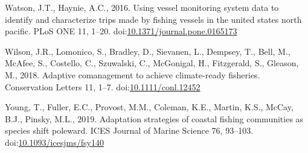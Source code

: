 \documentclass[]{elsarticle} %
\begin{document}
\leavevmode\hypertarget{ref-Watson2016}{}%
Watson, J.T., Haynie, A.C., 2016. Using vessel monitoring system data to
identify and characterize trips made by fishing vessels in the united
states north pacific. PLoS ONE 11, 1--20.
doi:\href{https://doi.org/10.1371/journal.pone.0165173}{10.1371/journal.pone.0165173}

\leavevmode\hypertarget{ref-Wilson2018}{}%
Wilson, J.R., Lomonico, S., Bradley, D., Sievanen, L., Dempsey, T.,
Bell, M., McAfee, S., Costello, C., Szuwalski, C., McGonigal, H.,
Fitzgerald, S., Gleason, M., 2018. Adaptive comanagement to achieve
climate-ready fisheries. Conservation Letters 11, 1--7.
doi:\href{https://doi.org/10.1111/conl.12452}{10.1111/conl.12452}

\leavevmode\hypertarget{ref-Young2019}{}%
Young, T., Fuller, E.C., Provost, M.M., Coleman, K.E., Martin, K.S.,
McCay, B.J., Pinsky, M.L., 2019. Adaptation strategies of coastal
fishing communities as species shift poleward. ICES Journal of Marine
Science 76, 93--103.
doi:\href{https://doi.org/10.1093/icesjms/fsy140}{10.1093/icesjms/fsy140}
\end{document}
